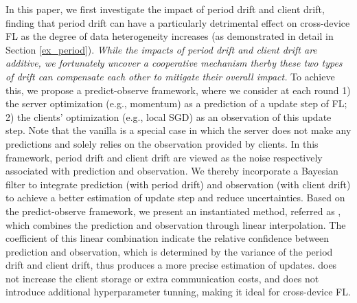 In this paper, we first investigate the impact of period drift and client drift, finding that period drift can have a particularly detrimental effect on cross-device FL as the degree of data heterogeneity increases (as demonstrated in detail in Section \ref{ex_period}). \textit{While the impacts of period drift and client drift are additive, we fortunately uncover a cooperative mechanism therby these two types of drift can compensate each other to mitigate their overall impact.} To achieve this, we propose a predict-observe framework, where we consider at each round 1) the server optimization (e.g., momentum) as a prediction of a update step of FL; 2) the clients' optimization (e.g., local SGD) as an observation of this update step. Note that the vanilla \fedavg is a special case in which the server does not make any predictions and solely relies on the observation provided by clients. In this framework, period drift and client drift are viewed as the noise respectively associated with prediction and observation. We thereby incorporate a Bayesian filter to integrate prediction (with period drift) and observation (with client drift) to achieve a better estimation of update step and reduce uncertainties. Based on the predict-observe framework, we present an instantiated method, referred as \fedeve, which combines the prediction and observation through linear interpolation. The coefficient of this linear combination indicate the relative confidence between prediction and observation, which is determined by the variance of the period drift and client drift, thus produces a more precise estimation of updates. \fedeve does not increase the client storage or extra communication costs, and does not introduce additional hyperparameter tunning, making it ideal for cross-device FL. 

